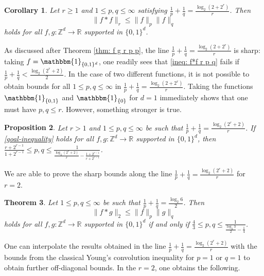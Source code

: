 \documentclass[reqno, 10pt]{amsart}
\theoremstyle{plain}
\numberwithin{equation}{section}
\newtheorem{theorem}{Theorem}[section]
\newtheorem{corollary}[theorem]{Corollary}
\newtheorem{proposition}[theorem]{Proposition}
\theoremstyle{definition}
\newtheorem*{induction hypothesis}{Induction hypothesis}
\theoremstyle{remark}
\newcommand{\R}{\mathbb{R}}
\newcommand{\Z}{\mathbb{Z}}
\begin{document}
\begin{corollary}\label{cor:f f pqr}
Let $r\geq 1$ and $1 \leq p,q \leq \infty$ satisfying $\frac{1}{p} + \frac{1}{q}=\frac{\log_2(2+2^r)}{r}$. Then
\begin{equation}\label{ineq: f*f r p q}
\|f*f\|_r\leq \|f\|_{p} \|f\|_q
\end{equation}
holds for all $f,g:\Z^d\to \R$ supported in $\{0,1\}^d$.   
\end{corollary}

As discussed after Theorem \ref{thm: f g r p p}, the line $\frac{1}{p} + \frac{1}{q}=\frac{ \log_2(2+2^r)}{r}$ is sharp: taking $f=\mathbbm{1}_{\{0,1\}^d}$, one readily sees that \eqref{ineq: f*f r p q} fails if $\frac{1}{p} + \frac{1}{q} < \frac{\log_2(2^r+2)}{2}$. In the case of two different functions, it is not possible to obtain bounds for all  $1 \leq p,q \leq \infty$ in $\frac{1}{p} + \frac{1}{q}=\frac{ \log_2(2+2^r)}{r}$. Taking the functions $\mathbbm{1}_{\{0,1\}}$ and $\mathbbm{1}_{\{0\}}$ for $d=1$ immediately shows that one must have $p,q \leq r$. However, something stronger is true. 

\begin{proposition}\label{prop:necessary critical line}
Let $r > 1$ and $1\leq p,q \leq \infty$ be such that $\frac{1}{p}+\frac{1}{q}=\frac{\log_{2}(2^r+2)}{r}$. If \eqref{goal-inequality} holds for all $f,g:\Z^d\to \R$ supported in $\{0,1\}^d$, then $\frac{r+2^{r-1}}{1+2^{r-1}}\leq p,q\leq \frac{1}{\frac{\log_2 (2^r+2)}{r}-\frac{1+2^{r-1}}{r+2^{r-1}}}$.
\end{proposition}

We are able to prove the sharp bounds along the line $\frac{1}{p}+\frac{1}{q}=\frac{\log_{2}(2^r+2)}{r}$ for $r=2$.

\begin{theorem}\label{thm:r=2 critical line}
Let $1\leq p,q \leq \infty$ be such that $\frac{1}{p}+\frac{1}{q}=\frac{\log_{2}6}{2}$. Then
\begin{equation}\label{ineq: lem f*g 2 p q}
\|f*g\|_2\leq \|f\|_{p}\|g\|_q
\end{equation}
holds for all $f,g:\Z^d\to \R$ supported in $\{0,1\}^d$ if and only if $\frac{4}{3}\leq p,q\leq \frac{1}{\frac{\log_2 3}{2}-\frac{1}{4}}$.
\end{theorem}


One can interpolate the results obtained in the line $\frac{1}{p}+\frac{1}{q}=\frac{\log_{2}(2^r+2)}{r}$ with the bounds from the classical Young's convolution inequality for $p=1$ or $q=1$ to obtain further off-diagonal bounds. In the $r=2$, one obtains the following.
\end{document}
